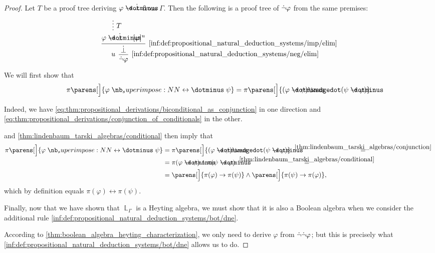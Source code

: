 \begin{proof}
   Let \( T \) be a proof tree deriving \( \varphi \synimplies \synbot \) from \( \Gamma \). Then the following is a proof tree of \( \dot{\neg} \varphi \) from the same premises:
  \begin{equation*}
    \begin{prooftree}
      \hypo{}
      \ellipsis {\( T \)} { \varphi \synimplies \synbot }
      \hypo{ [\varphi]^u }
      \infer2[\ref{inf:def:propositional_natural_deduction_systems/imp/elim}]{ \synbot }

      \infer[left label=\( u \)]1[\ref{inf:def:propositional_natural_deduction_systems/neg/elim}]{ \synneg \varphi }
    \end{prooftree}
  \end{equation*}

   We will first show that
  \begin{equation*}
    \pi\parens[\Big]{ \varphi \syniff \psi } = \pi\parens[\Big]{ (\varphi \synimplies \psi) \synwedge (\psi \synimplies \varphi) }.
  \end{equation*}

  Indeed, we have \eqref{eq:thm:propositional_derivations/biconditional_as_conjunction} in one direction and \eqref{eq:thm:propositional_derivations/conjunction_of_conditionals} in the other.

   and \cref{thm:lindenbaum_tarski_algebras/conditional} then imply that
  \begin{align*}
    \pi\parens[\Big]{ \varphi \syniff \psi }
    &=
    \pi\parens[\Big]{ (\varphi \synimplies \psi) \synwedge (\psi \synimplies \varphi) }
    \reloset {\ref{thm:lindenbaum_tarski_algebras/conjunction}} = \\ &=
    \pi(\varphi \synimplies \psi) \wedge \pi(\psi \synimplies \varphi)
    \reloset {\ref{thm:lindenbaum_tarski_algebras/conditional}} = \\ &=
    \parens[\Big]{ \pi(\varphi) \rightarrow \pi(\psi) } \wedge \parens[\Big]{ \pi(\psi) \rightarrow \pi(\varphi) },
  \end{align*}
  which by definition equals \( \pi(\varphi) \leftrightarrow \pi(\psi) \).

   Finally, now that we have shown that \( \BbbL_\Gamma \) is a Heyting algebra, we must show that it is also a Boolean algebra when we consider the additional rule \ref{inf:def:propositional_natural_deduction_systems/bot/dne}.

  According to \cref{thm:boolean_algebra_heyting_characterization}, we only need to derive \( \varphi \) from \( \dot{\neg} \dot{\neg} \varphi \); but this is precisely what \ref{inf:def:propositional_natural_deduction_systems/bot/dne} allows us to do.
\end{proof}


